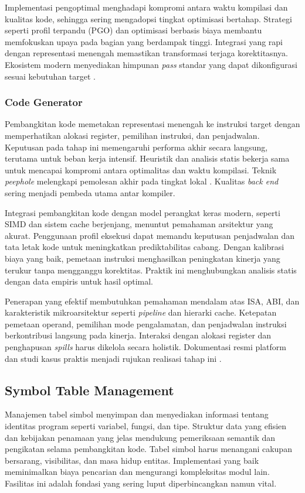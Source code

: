 \documentclass[../main.tex]{subfiles}
\begin{document}
Implementasi pengoptimal menghadapi kompromi antara waktu kompilasi dan kualitas kode, sehingga sering mengadopsi tingkat optimisasi bertahap. Strategi seperti profil terpandu (PGO) dan optimisasi berbasis biaya membantu memfokuskan upaya pada bagian yang berdampak tinggi. Integrasi yang rapi dengan representasi menengah memastikan transformasi terjaga korektitasnya. Ekosistem modern menyediakan himpunan \emph{pass} standar yang dapat dikonfigurasi sesuai kebutuhan target \citep{LLVMOverview,WikiOptimization}.

\subsubsection{Code Generator}
Pembangkitan kode memetakan representasi menengah ke instruksi target dengan memperhatikan alokasi register, pemilihan instruksi, dan penjadwalan. Keputusan pada tahap ini memengaruhi performa akhir secara langsung, terutama untuk beban kerja intensif. Heuristik dan analisis statis bekerja sama untuk mencapai kompromi antara optimalitas dan waktu kompilasi. Teknik \emph{peephole} melengkapi pemolesan akhir pada tingkat lokal \citep{WikiPeephole}. Kualitas \emph{back end} sering menjadi pembeda utama antar kompiler.

Integrasi pembangkitan kode dengan model perangkat keras modern, seperti SIMD dan sistem cache berjenjang, menuntut pemahaman arsitektur yang akurat. Penggunaan profil eksekusi dapat memandu keputusan penjadwalan dan tata letak kode untuk meningkatkan prediktabilitas cabang. Dengan kalibrasi biaya yang baik, pemetaan instruksi menghasilkan peningkatan kinerja yang terukur tanpa mengganggu korektitas. Praktik ini menghubungkan analisis statis dengan data empiris untuk hasil optimal.

Penerapan yang efektif membutuhkan pemahaman mendalam atas ISA, ABI, dan karakteristik mikroarsitektur seperti \emph{pipeline} dan hierarki cache. Ketepatan pemetaan operand, pemilihan mode pengalamatan, dan penjadwalan instruksi berkontribusi langsung pada kinerja. Interaksi dengan alokasi register dan penghapusan \emph{spills} harus dikelola secara holistik. Dokumentasi resmi platform dan studi kasus praktis menjadi rujukan realisasi tahap ini \citep{WikiInstructionSelection,WikiRegisterAllocation}.

\subsection{Symbol Table Management}
Manajemen tabel simbol menyimpan dan menyediakan informasi tentang identitas program seperti variabel, fungsi, dan tipe. Struktur data yang efisien dan kebijakan penamaan yang jelas mendukung pemeriksaan semantik dan pengikatan selama pembangkitan kode. Tabel simbol harus menangani cakupan bersarang, visibilitas, dan masa hidup entitas. Implementasi yang baik meminimalkan biaya pencarian dan mengurangi kompleksitas modul lain. Fasilitas ini adalah fondasi yang sering luput diperbincangkan namun vital.
\end{document}
